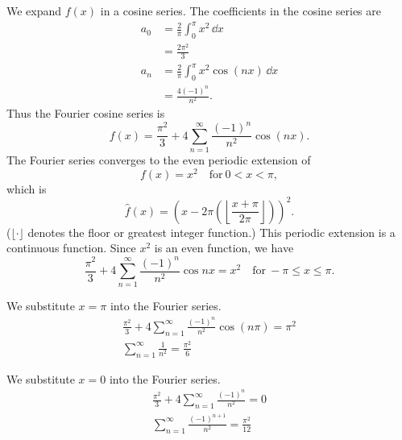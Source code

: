 {%
\begin{Solution}
  We expand $f(x)$ in a cosine series. The coefficients in the cosine series are
  \begin{align*}
    a_0     &= \frac{2}{\pi} \int_0^\pi x^2\,\dd x \\
    &= \frac{2 \pi^2}{3} \\
    a_n     &= \frac{2}{\pi} \int_0^\pi x^2 \cos(n x)\,\dd x \\
    &= \frac{4(-1)^n}{n^2}.
  \end{align*}
  Thus the Fourier cosine series is
  \[ 
  f(x) = \frac{\pi^2}{3} + 4 \sum_{n = 1}^\infty \frac{(-1)^n}{n^2} \cos(n x).
  \]
  The Fourier series converges to the even periodic extension of 
  \[
  f(x) = x^2 \quad \mathrm{for}\ 0 < x < \pi,
  \]
  which is 
  \[
  \boxed{
    \hat{f}(x) = \left( x - 2 \pi \left( \left\lfloor \frac{x + \pi}{2\pi} 
        \right\rfloor \right) \right)^2.
    }
  \]
  ($\lfloor \cdot \rfloor$ denotes the floor or greatest integer function.)
  This periodic extension is a continuous function.  Since $x^2$ is an 
  even function, we have
  \[
  \boxed{
    \frac{\pi^2}{3} + 4 \sum_{n=1}^\infty \frac{(-1)^n}{n^2} \cos nx = x^2
    \quad \mathrm{for}\ -\pi \leq x \leq \pi.
    }
  \]

  We substitute $x = \pi$ into the Fourier series.
  \begin{gather*}
    \frac{\pi^2}{3} + 4 \sum_{n=1}^\infty \frac{(-1)^n}{n^2} \cos(n\pi) = \pi^2 \\
    \boxed{
      \sum_{n = 1}^\infty \frac{1}{n^2} = \frac{\pi^2}{6}
      }
  \end{gather*}

  We substitute $x = 0$ into the Fourier series.
  \begin{gather*}
    \frac{\pi^2}{3} + 4 \sum_{n=1}^\infty \frac{(-1)^n}{n^2} = 0 \\
    \boxed{
      \sum_{n = 1}^\infty \frac{(-1)^{n+1}}{n^2} = \frac{\pi^2}{12}
      }
  \end{gather*}
\end{Solution}




}
